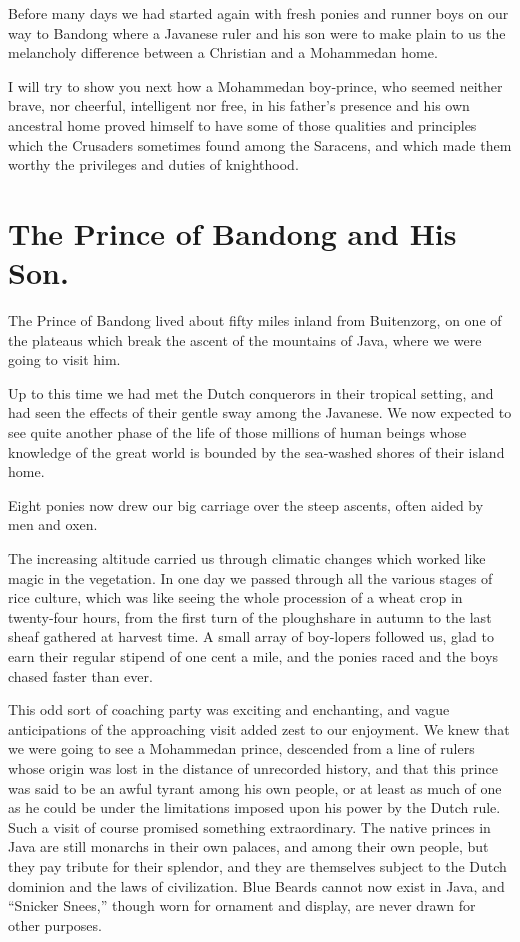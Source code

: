\documentclass[12pt]{book}
\begin{document}
Before many days we had started again with fresh ponies and runner boys on
our way to Bandong where a Javanese ruler and his son were to make plain to us
the melancholy difference between a Christian and a Mohammedan home.

I will try to show you next how a Mohammedan boy‐prince, who seemed
neither brave, nor cheerful, intelligent nor free, in his father’s presence and his
own ancestral home proved himself to have some of those qualities and principles
which the Crusaders sometimes found among the Saracens, and which made them
worthy the privileges and duties of knighthood.

\chapter{The Prince of Bandong and His Son.}

The Prince of Bandong lived about fifty miles inland from Buitenzorg, on one of
the plateaus which break the ascent of the mountains of Java, where we were
going to visit him.

Up to this time we had met the Dutch conquerors in their tropical setting, and
had seen the effects of their gentle sway among the Javanese. We now expected
to see quite another phase of the life of those millions of human beings whose
knowledge of the great world is bounded by the sea‐washed shores of their island
home.

Eight ponies now drew our big carriage over the steep ascents, often aided by
men and oxen.

The increasing altitude carried us through climatic changes which worked
like magic in the vegetation. In one day we passed through all the various stages
of rice culture, which was like seeing the whole procession of a wheat crop in
twenty‐four hours, from the first turn of the ploughshare in autumn to the last
sheaf gathered at harvest time. A small array of boy‐lopers followed us, glad to
earn their regular stipend of one cent a mile, and the ponies raced and the boys
chased faster than ever.

This odd sort of coaching party was exciting and enchanting, and vague
anticipations of the approaching visit added zest to our enjoyment. We knew
that we were going to see a Mohammedan prince, descended from a line of rulers
whose origin was lost in the distance of unrecorded history, and that this prince
was said to be an awful tyrant among his own people, or at least as much of one
as he could be under the limitations imposed upon his power by the Dutch rule.
Such a visit of course promised something extraordinary. The native princes in
Java are still monarchs in their own palaces, and among their own people, but
they pay tribute for their splendor, and they are themselves subject to the Dutch
dominion and the laws of civilization. Blue Beards cannot now exist in Java, and
“Snicker Snees,” though worn for ornament and display, are never drawn for other
purposes.
\end{document}
